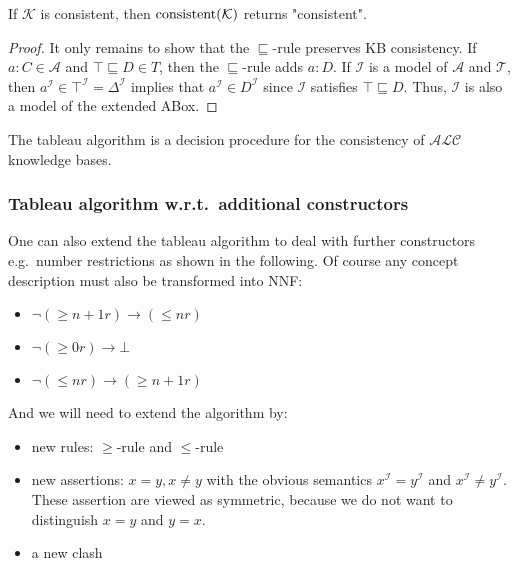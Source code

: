 \begin{lemma}[Completeness]
	If $ \mathcal{K}$ is consistent, then $\operatorname{\text{consistent}}(\mathcal{K})$ returns "consistent".
\end{lemma}
\begin{proof}
	It only remains to show that the $\sqsubseteq$-rule preserves KB consistency.
	If $a :C \in \mathcal{A}$ and $\top \sqsubseteq D \in T$,
	then the $\sqsubseteq$-rule adds $a:D$.
	If $\mathcal{I}$ is a model of $\mathcal{A}$ and $\mathcal{T}$, then
	$a^\mathcal{I} \in \top^\mathcal{I}=\Delta^\mathcal{I}$ implies that $a^\mathcal{I} \in D^\mathcal{I}$ 
	since $\mathcal{I}$ satisfies $\top \sqsubseteq D$.
	Thus, $\mathcal{I}$ is also a model of the extended ABox.
\end{proof}

\begin{theorem}
	The tableau algorithm is a decision procedure for the consistency of $\mathcal{ALC}$ knowledge bases.
\end{theorem}

\subsubsection{Tableau algorithm w.r.t.\ additional constructors}
One can also extend the tableau algorithm to deal with further constructors e.g.\ number restrictions as shown in the following.
Of course any concept description must also be transformed into NNF:
\begin{itemize}
	\item $\neg \left( \geq n+1 r \right) \to ( \leq n r)$ 
	\item $\neg \left( \geq 0 r \right) \to \bot$
	\item $\neg \left( \leq n r \right) \to \left( \geq n + 1 r \right)$
\end{itemize}
And we will need to extend the algorithm by:
\begin{itemize}
	\item new rules: $ \geq$-rule and $ \leq$-rule
	\item new assertions: $x=y, x \neq y$ with the obvious semantics $x^\mathcal{I} = y^\mathcal{I}$ and $x^\mathcal{I} \neq y^\mathcal{I}$.
		These assertion are viewed as symmetric, because we do not want to distinguish $x = y$ and $y = x$.
	 \item a new clash
\end{itemize}


